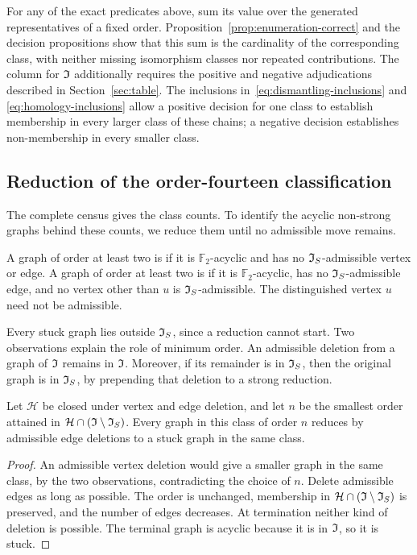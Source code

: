 For any of the exact predicates above, sum its value over the generated
representatives of a fixed order. Proposition~\ref{prop:enumeration-correct}
and the decision propositions show that this sum is the cardinality
of the corresponding class, with neither missing isomorphism classes
nor repeated contributions. The column for $\mathfrak I$ additionally requires
the positive and negative adjudications described in
Section~\ref{sec:table}.
The inclusions in~\eqref{eq:dismantling-inclusions} and
\eqref{eq:homology-inclusions} allow a positive decision for one
class to establish membership in every larger class of these chains;
a negative decision establishes non-membership in every smaller class.

\subsection{Reduction of the order-fourteen classification}\label{sec:reduction}

The complete census gives the class counts. To identify the acyclic
non-strong graphs behind these counts, we reduce them until no
admissible move remains.

\begin{definition}\label{def:stuck}
A graph of order at least two is  if it is
$\mathbb F_2$-acyclic and has no $\mathfrak I_S$-admissible vertex or edge.
A graph of order at least two is  if it is
$\mathbb F_2$-acyclic,
has no $\mathfrak I_S$-admissible edge, and no vertex other than $u$ is
$\mathfrak I_S$-admissible. The distinguished vertex $u$ need not be admissible.
\end{definition}

Every stuck graph lies outside $\mathfrak I_S$, since a reduction cannot start.
Two observations explain the role of minimum order. An admissible
deletion from a graph of $\mathfrak I$ remains in $\mathfrak I$. Moreover, if its
remainder is in $\mathfrak I_S$, then the original graph is in $\mathfrak I_S$, by
prepending that deletion to a strong reduction.

\begin{lemma}\label{lem:stuck}
Let $\mathcal H$ be closed under vertex and edge deletion, and let $n$
be the smallest order attained in $\mathcal H\cap(\mathfrak I\setminus\mathfrak I_S)$.
Every graph in this class of order $n$ reduces by admissible edge
deletions to a stuck graph in the same class.
\end{lemma}
\begin{proof}
An admissible vertex deletion would give a smaller graph in the same
class, by the two observations, contradicting the choice of $n$.
Delete admissible edges as long as possible. The order is unchanged,
membership in $\mathcal H\cap(\mathfrak I\setminus\mathfrak I_S)$ is preserved, and
the number of edges decreases. At termination neither kind of
deletion is possible. The terminal graph is acyclic because it is
in $\mathfrak I$, so it is stuck.
\end{proof}

